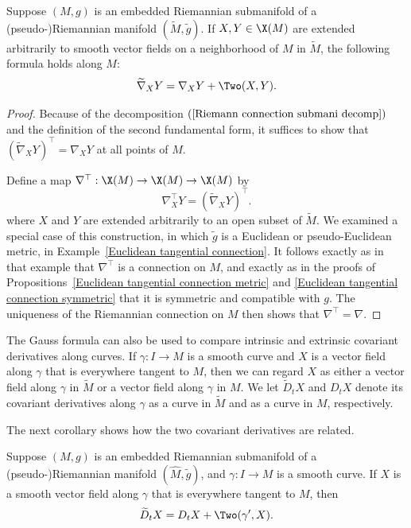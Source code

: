 \begin{theorem}\label{Riemann Levi-Civita submani}
Suppose $(M,g)$ is an embedded Riemannian submanifold of a (pseudo-)Riemannian manifold $(\widetilde{M},\tilde{g})$. If $X,Y\in\X(M)$ are extended arbitrarily to smooth vector fields on a neighborhood of $M$ in $\widetilde{M}$, the following formula holds along $M$:
\[\widetilde{\nabla}_XY=\nabla_XY+\Two(X,Y).\]
\end{theorem}
\begin{proof}
Because of the decomposition $(\ref{Riemann connection submani decomp})$ and the definition of the second fundamental form, it suffices to show that $(\widetilde{\nabla}_XY)^\top=\nabla_XY$ at all points of $M$.\par
Define a map $\nabla^{\top}:\X(M)\to\X(M)\to\X(M)$ by
\[\nabla^{\top}_XY=(\widetilde{\nabla}_XY)^\top.\]
where $X$ and $Y$ are extended arbitrarily to an open subset of $\widetilde{M}$. We examined a special case of this construction, in which $\tilde{g}$ is a Euclidean or pseudo-Euclidean metric, in Example~\ref{Euclidean tangential connection}. It follows exactly as in that example that $\nabla^{\top}$ is a connection on $M$, and exactly as in the proofs of Propositions~\ref{Euclidean tangential connection metric} and \ref{Euclidean tangential connection symmetric} that it is symmetric and compatible with $g$. The uniqueness of the Riemannian connection on $M$ then shows that $\nabla^{\top}=\nabla$.
\end{proof}
The Gauss formula can also be used to compare intrinsic and extrinsic covariant derivatives along curves. If $\gamma:I\to M$ is a smooth curve and $X$ is a vector field along $\gamma$ that is everywhere tangent to $M$, then we can regard $X$ as either a vector field along $\gamma$ in $\widetilde{M}$ or a vector field along $\gamma$ in $M$. We let $\widetilde{D}_tX$ and $D_tX$ denote its covariant derivatives along $\gamma$ as a curve in $\widetilde{M}$ and as a curve in $M$, respectively.\par
The next corollary shows how the two covariant derivatives are related.
\begin{corollary}
Suppose $(M,g)$ is an embedded Riemannian submanifold of a (pseudo-)Riemannian manifold $(\widehat{M},\tilde{g})$, and $\gamma:I\to M$ is a smooth curve. If $X$ is a smooth vector field along $\gamma$ that is everywhere tangent to $M$, then
\begin{align}\label{Riemann connection submani curve-1}
\widetilde{D}_tX=D_tX+\Two(\gamma',X).
\end{align}
\end{corollary}
